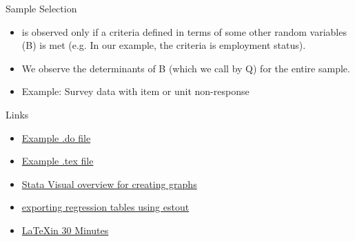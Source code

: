 \documentclass{beamer}
\begin{document}
\begin{frame}{Sample Selection}
\begin{itemize}
\item is observed only if a criteria defined in terms of some other random
 variables (B) is met (e.g. In our example, the criteria is employment status).
\item We observe the determinants of B (which we call by Q) for the entire 
sample.
\item Example: Survey data with item or unit non-response
\end{itemize}
\end{frame}


\begin{frame}{Links}

\begin{itemize}
\item \href{https://github.com/mhdsh1/are256b-w24/blob/main/example.do}
{Example .do file} 
\item \href{https://github.com/mhdsh1/are256b-w24/blob/main/example.tex}
{Example .tex file}
\item \href{https://www.stata.com/support/faqs/graphics/gph/stata-graphs/}
{Stata Visual overview for creating graphs}
\item \href{https://repec.sowi.unibe.ch/stata/estout/index.html}
{exporting regression tables using estout}
\item \href{https://www.overleaf.com/learn/latex/Learn_LaTeX_in_30_minutes}
{\LaTeX in 30 Minutes}
\end{itemize}

\end{frame}
\end{document}
